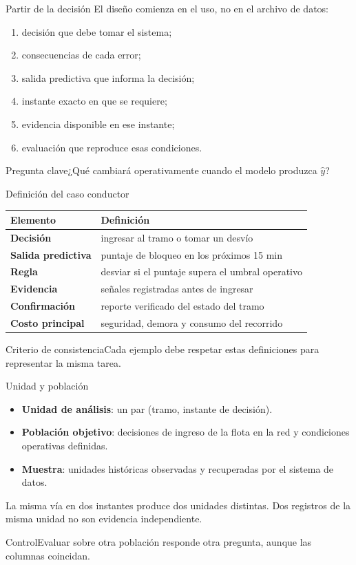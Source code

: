 \documentclass[aspectratio=169,10pt]{beamer}
\newcommand{\concepto}[1]{\textcolor{UAPTeal}{\textbf{#1}}}
\newcommand{\pregunta}[1]{\begin{block}{Pregunta clave}#1\end{block}}
\begin{document}
\begin{frame}{Partir de la decisión}
  \small El diseño comienza en el uso, no en el archivo de datos:
  \begin{enumerate}
    \item decisión que debe tomar el sistema; \item consecuencias de cada error;
    \item salida predictiva que informa la decisión; \item instante exacto en que se requiere;
    \item evidencia disponible en ese instante; \item evaluación que reproduce esas condiciones.
  \end{enumerate}
  \pregunta{¿Qué cambiará operativamente cuando el modelo produzca $\hat y$?}
\end{frame}

\begin{frame}{Definición del caso conductor}
  \scriptsize
  \begin{tabularx}{\textwidth}{>{\bfseries}p{}X}\toprule
  Elemento & Definición\\\midrule
  Decisión & ingresar al tramo o tomar un desvío\\ Salida predictiva & puntaje de bloqueo en los próximos 15 min\\
  Regla & desviar si el puntaje supera el umbral operativo\\ Evidencia & señales registradas antes de ingresar\\
  Confirmación & reporte verificado del estado del tramo\\ Costo principal & seguridad, demora y consumo del recorrido\\\bottomrule
  \end{tabularx}
  \begin{block}{Criterio de consistencia}Cada ejemplo debe respetar estas definiciones para representar la misma tarea.\end{block}
\end{frame}

\begin{frame}{Unidad y población}
  \small
  \begin{itemize}
    \item \concepto{Unidad de análisis}: un par (tramo, instante de decisión).
    \item \concepto{Población objetivo}: decisiones de ingreso de la flota en la red y condiciones operativas definidas.
    \item \concepto{Muestra}: unidades históricas observadas y recuperadas por el sistema de datos.
  \end{itemize}
  La misma vía en dos instantes produce dos unidades distintas. Dos registros de la misma unidad no son evidencia independiente.
  \begin{alertblock}{Control}Evaluar sobre otra población responde otra pregunta, aunque las columnas coincidan.\end{alertblock}
\end{frame}
\end{document}
